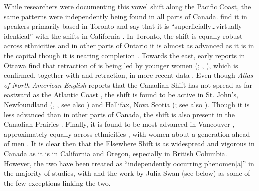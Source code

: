 While researchers were documenting this vowel shift along the Pacific Coast, the same patterns were independently being found in all parts of Canada. \citeauthor{clarke_etal_1995} find it in speakers primarily based in Toronto and say that it is ``superficially\ldots virtually identical'' with the shifts in California \citeyearpar[213]{clarke_etal_1995}. In Toronto, the shift is equally robust across ethnicities \citep{hoffman_2010} and in other parts of Ontario it is almost as advanced as it is in the capital \citep{roeder_2012} though it is nearing completion \citep{roeder_jarmasz_2010}. Towards the east, early reports in Ottawa find that retraction of \trap is being led by younger women (\citealt[151--153]{woods_1979}; \citeyear{woods_1993}, \citealt{de_wolf_1992}), which is confirmed, together with \dress and \kit retraction, in more recent data \citep{boberg_2005}. Even though \textit{Atlas of North American English} reports that the Canadian Shift has not spread as far eastward as the Atlantic Coast \citep[220]{labov_ash_boberg_2006_anae}, the shift is found to be active in St. John's, Newfoundland (\citealt{hollett_2006},  \citealt{darcy_2005}, see also \citealt{clarke_1991}) and Hallifax, Nova Scotia (\citealt{sadlier_brown_tamminga_2008}; see also \citealt{boberg_2008}). Though it is less advanced than in other parts of Canada, the shift is also present in the Canadian Prairies \citep{boberg_2011, hagiwara_2006}. Finally, it is found to be most advanced in Vancouver \citep{hall_2000, tamminga_sadlier_brown_2008, roeder_etal_2018}, approximately equally across ethnicities \citep{presnyakova_etal_2018}, with women about a generation ahead of men \citep{esling_warkentyne_1993}. It is clear then that the Elsewhere Shift is as widespread and vigorous in Canada as it is in California and Oregon, especially in British Columbia. However, the two have been treated as ``independently occurring phenomen[a]'' \citep[41]{kennedy_grama_2012} in the majority of studies, with \citet{boberg_2019} and the work by Julia Swan (see below) as some of the few exceptions linking the two.


